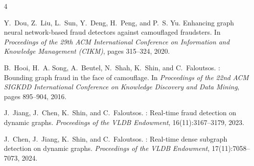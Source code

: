 \documentclass[11pt]{article}
\begin{document}

\begin{thebibliography}{4}

Y.~Dou, Z.~Liu, L.~Sun, Y.~Deng, H.~Peng, and P.~S. Yu.
\newblock Enhancing graph neural network-based fraud detectors against
  camouflaged fraudsters.
\newblock In \emph{Proceedings of the 29th ACM International Conference on
  Information and Knowledge Management (CIKM)}, pages 315--324, 2020.

B.~Hooi, H.~A. Song, A.~Beutel, N.~Shah, K.~Shin, and C.~Faloutsos.
: Bounding graph fraud in the face of camouflage.
\newblock In \emph{Proceedings of the 22nd ACM SIGKDD International Conference
  on Knowledge Discovery and Data Mining}, pages 895--904, 2016.

J.~Jiang, J.~Chen, K.~Shin, and C.~Faloutsos.
: Real-time fraud detection on dynamic graphs.
\newblock \emph{Proceedings of the VLDB Endowment}, 16(11):3167--3179, 2023.

J.~Chen, J.~Jiang, K.~Shin, and C.~Faloutsos.
: Real-time dense subgraph detection on dynamic graphs.
\newblock \emph{Proceedings of the VLDB Endowment}, 17(11):7058--7073, 2024.

\end{thebibliography}
\end{document}
